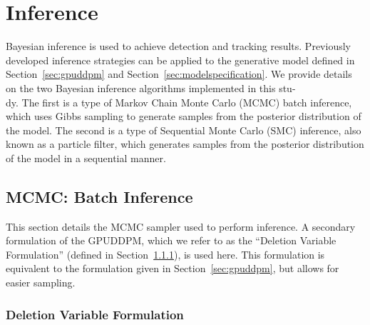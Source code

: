 \documentclass[twocolumn, final]{svjour3}
\begin{document}

\section{Inference}
\label{sec:inference}

Bayesian inference is used to achieve detection and tracking results. Previously developed inference strategies can be applied to the generative model defined in Section~\ref{sec:gpuddpm} and Section~\ref{sec:modelspecification}. We provide details on the two Bayesian inference algorithms implemented in this stu-\\dy. The first is a type of Markov Chain Monte Carlo (MCMC) batch inference, which uses Gibbs sampling to generate samples from the posterior distribution of the model. The second is a type of Sequential Monte Carlo (SMC) inference, also known as a particle filter, which generates samples from the posterior distribution of the model in a sequential manner.


\subsection{MCMC: Batch Inference}
\label{sec:MCMC}

This section details the MCMC sampler used to perform inference.
A secondary formulation of the GPUDDPM, which we refer to as the ``Deletion Variable Formulation'' (defined in Section~\ref{sec:deletionvariableformulation}), is used here. This formulation is equivalent to the formulation given in Section~\ref{sec:gpuddpm}, but allows for easier sampling.


\subsubsection{Deletion Variable Formulation}
\label{sec:deletionvariableformulation}
\end{document}

